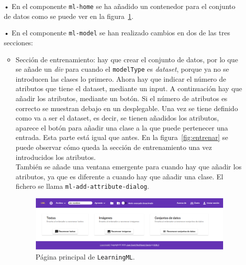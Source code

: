 \documentclass[a4paper, 12pt]{book}
\begin{document}
\begin{itemize}
	\item[•] En el componente \texttt{ml-home} se ha añadido un contenedor para el conjunto de datos como se puede ver en la figura~\ref{fig:pagina_principal}.
	\item[•] En el componente \texttt{ml-model} se han realizado cambios en dos de las tres secciones:
	\begin{itemize}
		\item Sección de entrenamiento: hay que crear el conjunto de datos, por lo que se añade un \emph{div} para cuando el \texttt{modelType} es \emph{dataset}, porque ya no se introducen las clases lo primero. 
		Ahora hay que indicar el número de atributos que tiene el dataset, mediante un input. 
		A continuación hay que añadir los atributos, mediante un botón. 
		Si el número de atributos es correcto se muestran debajo en un desplegable. 
		Una vez se tiene definido como va a ser el dataset, es decir, se tienen añadidos los atributos, aparece el botón para añadir una clase a la que puede pertenecer una entrada. Esta parte está igual que antes. 
		En la figura~\ref{fig:entrenar} se puede observar cómo queda la sección de entrenamiento una vez introducidos los atributos.\\
		También se añade una ventana emergente para cuando hay que añadir los atributos, ya que es diferente a cuando hay que añadir una clase. El fichero se llama \texttt{ml-add-attribute-dialog}.

\begin{figure}
	\centering 
	\includegraphics[width=13cm, keepaspectratio]{img/pag_principal.png}
	\caption{Página principal de \texttt{LearningML}.} \label{fig:pagina_principal}
\end{figure}


\end{itemize}
\end{itemize}
\end{document}
